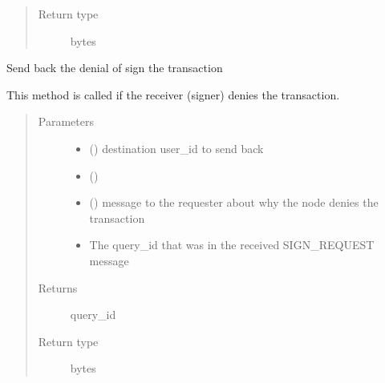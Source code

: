 \documentclass[letterpaper,10pt,english]{sphinxmanual}
\begin{document}
\begin{fulllineitems}
\begin{fulllineitems}
\begin{quote}
\begin{description}
\item[{Return type}] \leavevmode
bytes

\end{description}\end{quote}

\end{fulllineitems}


\begin{fulllineitems}
\label{\detokenize{bbc1.core.bbc_app:bbc1.core.bbc_app.BBcAppClient.sendback_denial_of_sign}}
Send back the denial of sign the transaction

This method is called if the receiver (signer) denies the transaction.
\begin{quote}\begin{description}
\item[{Parameters}] \leavevmode\begin{itemize}
\item {} 
 () \textendash{} destination user\_id to send back

\item {} 
 () \textendash{} 

\item {} 
 () \textendash{} message to the requester about why the node denies the transaction

\item {} 
 \textendash{} The query\_id that was in the received SIGN\_REQUEST message

\end{itemize}

\item[{Returns}] \leavevmode
query\_id

\item[{Return type}] \leavevmode
bytes

\end{description}\end{quote}


\end{fulllineitems}
\end{fulllineitems}
\end{document}
